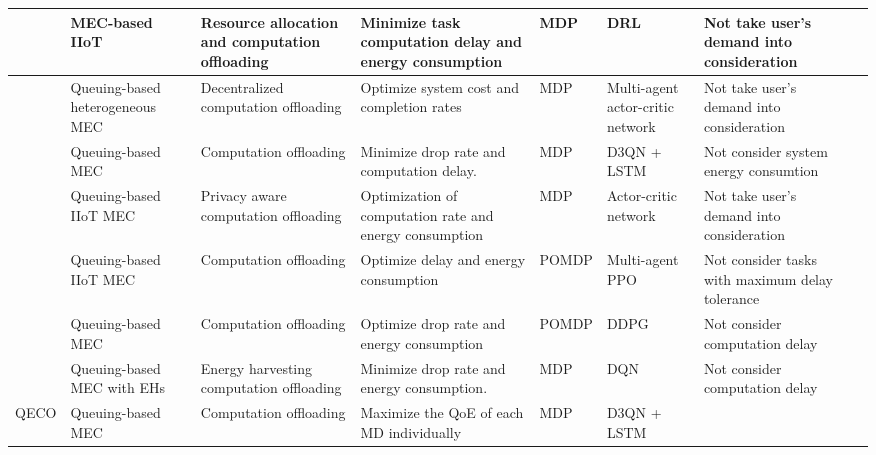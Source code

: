 \documentclass[12pt,draftclsnofoot,onecolumn]{IEEEtran}
\begin{document}
\begin{table}[htbp]
{{\begin{tabular}{ lp{3.4cm}p{4.5cm}p{5.2cm}p{1.7cm}p{3.1cm}p{4.6cm}l}
					\cite{gong2022edge} & MEC-based IIoT & Resource allocation and computation offloading & Minimize task computation delay and energy consumption & MDP & DRL & Not take user's demand into consideration\\\midrule
					\cite{gao2022large} & Queuing-based heterogeneous MEC & Decentralized computation offloading & Optimize system cost and completion rates & MDP & Multi-agent actor-critic network& Not take user's demand into consideration \\\midrule
					\cite{9253665} &  Queuing-based MEC &  Computation offloading & Minimize drop rate and computation delay. & MDP & D3QN + LSTM & Not consider system energy consumtion\\\midrule
					\cite{wu2024combining}  & Queuing-based IIoT MEC & Privacy aware computation offloading & Optimization of computation rate and energy consumption & MDP & Actor-critic network  & Not take user's demand into consideration \\\midrule
					\cite{wu2023multi} & Queuing-based IIoT MEC & Computation offloading & Optimize delay and energy consumption & POMDP & Multi-agent PPO&  Not consider tasks with maximum delay tolerance \\\midrule
					\cite{huang2021deadline} & Queuing-based MEC & Computation offloading & Optimize drop rate and energy consumption & POMDP & DDPG & Not consider computation delay \\ \midrule
					\cite{Bolourian-WCL24}  & Queuing-based MEC with EHs& Energy harvesting  computation offloading & Minimize drop rate and energy consumption. & MDP  & DQN & Not consider computation delay  \\\midrule
					QECO &  Queuing-based MEC &  Computation offloading & Maximize the QoE of each MD individually &MDP & D3QN + LSTM & \\
					\toprule
			\end{tabular}}
			\label{table1}}
	\end{table}
	
	
\end{document}
